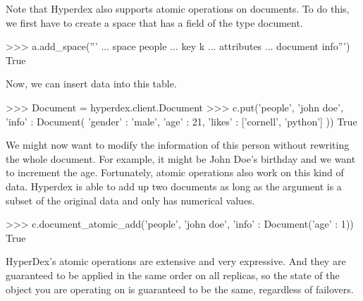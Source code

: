 Note that Hyperdex also supports atomic operations on documents. To do this, we first have to create a space that has a field of the type document.

\begin{pythoncode}
>>> a.add_space('''
... space people
... key k
... attributes
...    document info''')
True
\end{pythoncode}

Now, we can insert data into this table.

\begin{pythoncode}
>>> Document = hyperdex.client.Document
>>> c.put('people', 'john doe', {'info' : Document( {'gender' : 'male', 'age' : 21, 'likes' : ['cornell', 'python']} )})
True
\end{pythoncode}

We might now want to modify the information of this person without rewriting the whole document. For example, it might be John Doe's birthday and we want to increment the age. Fortunately, atomic operations also work on this kind of data. Hyperdex is able to add up two documents as long as the argument is a subset of the original data and only has numerical values.

\begin{pythoncode}
>>> c.document_atomic_add('people', 'john doe', {'info' : Document({'age' : 1})})
True
\end{pythoncode}

HyperDex's atomic operations are extensive and very expressive. And they are
guaranteed to be applied in the same order on all replicas, so the state of the
object you are operating on is guaranteed to be the same, regardless of
failovers.
